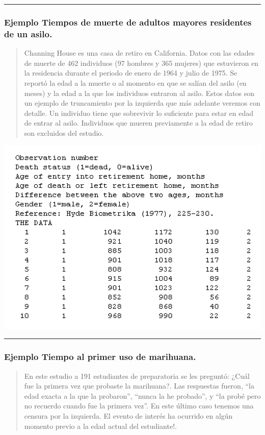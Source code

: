 \documentclass[
  letterpaper,
  DIV=11,
  numbers=noendperiod]{scrartcl}
\begin{document}
\begin{center}\rule{0.5\linewidth}{0.5pt}\end{center}

\subsubsection{Ejemplo Tiempos de muerte de adultos mayores residentes
de un
asilo.}\label{ejemplo-tiempos-de-muerte-de-adultos-mayores-residentes-de-un-asilo.}

\begin{quote}
Channing House es una casa de retiro en California. Datos con las edades
de muerte de 462 individuos (97 hombres y 365 mujeres) que estuvieron en
la residencia durante el periodo de enero de 1964 y julio de 1975. Se
reportó la edad a la muerte o al momento en que se salían del asilo (en
meses) y la edad a la que los individuos entraron al asilo. Estos datos
son un ejemplo de truncamiento por la izquierda que más adelante veremos
con detalle. Un individuo tiene que sobrevivir lo suficiente para estar
en edad de entrar al asilo. Individuos que mueren previamente a la edad
de retiro son excluidos del estudio.
\end{quote}

\begin{center}
\includegraphics[width=0.4\linewidth,height=\textheight,keepaspectratio]{figura/ejemp3.png}
\end{center}

\begin{center}\rule{0.5\linewidth}{0.5pt}\end{center}

\subsubsection{Ejemplo Tiempo al primer uso de
marihuana.}\label{ejemplo-tiempo-al-primer-uso-de-marihuana.}

\begin{quote}
En este estudio a 191 estudiantes de preparatoria se les preguntó: ¿Cuál
fue la primera vez que probaste la marihuana?. Las respuestas fueron,
``la edad exacta a la que la probaron'', ``nunca la he probado'', y ``la
probé pero no recuerdo cuando fue la primera vez''. En este último caso
tenemos una censura por la izquierda. El evento de interés ha ocurrido
en algún momento previo a la edad actual del estudiante!.
\end{quote}
\end{document}
